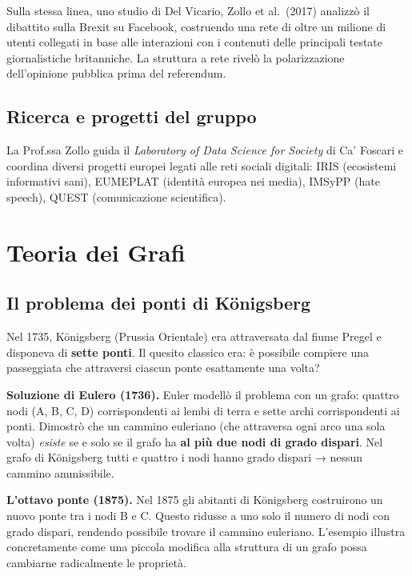 \documentclass[12pt,a4paper]{article}
\begin{document}
Sulla stessa linea, uno studio di Del Vicario, Zollo et al.\ (2017) analizzò il dibattito
sulla Brexit su Facebook, costruendo una rete di oltre un milione di utenti collegati
in base alle interazioni con i contenuti delle principali testate giornalistiche britanniche.
La struttura a rete rivelò la polarizzazione dell'opinione pubblica prima del referendum.

\subsection{Ricerca e progetti del gruppo}

La Prof.ssa Zollo guida il \textit{Laboratory of Data Science for Society} di Ca' Foscari
e coordina diversi progetti europei legati alle reti sociali digitali:
IRIS (ecosistemi informativi sani), EUMEPLAT (identità europea nei media),
IMSyPP (hate speech), QUEST (comunicazione scientifica).

\section{Teoria dei Grafi}

\subsection{Il problema dei ponti di Königsberg}

Nel 1735, Königsberg (Prussia Orientale) era attraversata dal fiume Pregel e disponeva di
\textbf{sette ponti}. Il quesito classico era: è possibile compiere una passeggiata che attraversi
ciascun ponte esattamente una volta?

\textbf{Soluzione di Eulero (1736).} Euler modellò il problema con un grafo: quattro nodi
(A, B, C, D) corrispondenti ai lembi di terra e sette archi corrispondenti ai ponti.
Dimostrò che un cammino euleriano (che attraversa ogni arco una sola volta) \emph{esiste} se
e solo se il grafo ha \textbf{al più due nodi di grado dispari}.
Nel grafo di Königsberg tutti e quattro i nodi hanno grado dispari → nessun cammino ammissibile.

\textbf{L'ottavo ponte (1875).} Nel 1875 gli abitanti di Königsberg costruirono un nuovo ponte
tra i nodi B e C. Questo ridusse a uno solo il numero di nodi con grado dispari, rendendo
possibile trovare il cammino euleriano. L'esempio illustra concretamente come una piccola
modifica alla struttura di un grafo possa cambiarne radicalmente le proprietà.
\end{document}
